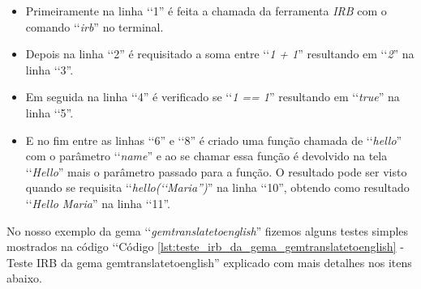 \begin{itemize}

 
  \item Primeiramente na linha ‘‘1'' é feita a chamada da ferramenta \emph{IRB} com o comando ‘‘\emph{irb}'' 
  no terminal.
 
 \item Depois na linha ‘‘2'' é requisitado a soma entre ‘‘\emph{1 + 1}'' resultando em ‘‘\emph{2}'' na linha 
 ‘‘3''.
 
 \item Em seguida na linha ‘‘4'' é verificado se ‘‘\emph{1 == 1}'' resultando em ‘‘\emph{true}'' na linha 
 ‘‘5''.

 \item E no fim entre as linhas ‘‘6'' e ‘‘8'' é criado uma função chamada de ‘‘\emph{hello}'' com o 
 parâmetro ‘‘\emph{name}'' e ao se chamar essa função é devolvido na tela ‘‘\emph{Hello}'' mais o 
 parâmetro passado para a função. O resultado pode ser visto quando se requisita 
 ‘‘\emph{hello(‘‘Maria'')}'' na linha ‘‘10'', obtendo como resultado ‘‘\emph{Hello Maria}'' na linha ‘‘11''.
 
\end{itemize}

No nosso exemplo da gema ‘‘\emph{gemtranslatetoenglish}'' fizemos alguns testes simples mostrados
na código ‘‘Código \ref{lst:teste_irb_da_gema_gemtranslatetoenglish} - Teste IRB da gema 
gemtranslatetoenglish'' explicado com mais detalhes nos itens abaixo.

